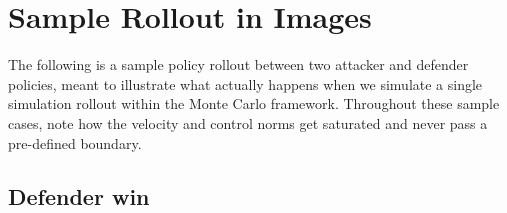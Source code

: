 \section{Sample Rollout in Images}
\label{sec:sample-rollout-images}

The following is a sample policy rollout between two attacker and defender policies, meant to illustrate what actually happens when we simulate a single simulation rollout within the Monte Carlo framework. Throughout these sample cases, note how the velocity and control norms get saturated and never pass a pre-defined boundary.

\subsection{Defender win}
\label{subsec:defender-win}

